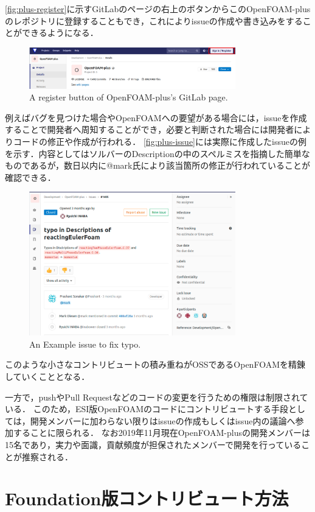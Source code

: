 \documentclass{ltjoc}
\begin{document}
\autoref{fig:plus-register}に示すGitLabのページの右上のボタンからこのOpenFOAM-plusのレポジトリに登録することもでき，これによりissueの作成や書き込みをすることができるようになる．
\begin{figure}[htbp]
\centering
\includegraphics[width=0.8\textwidth]{fig/plus_register.png}
\caption{A register button of OpenFOAM-plus's GitLab page.}
\label{fig:plus-register}
\end{figure}
例えばバグを見つけた場合やOpenFOAMへの要望がある場合には，issueを作成することで開発者へ周知することができ，必要と判断された場合には開発者によりコードの修正や作成が行われる．
\autoref{fig:plus-issue}には実際に作成したissueの例を示す．内容としてはソルバーのDescriptionの中のスペルミスを指摘した簡単なものであるが，数日以内に@mark氏により該当箇所の修正が行われていることが確認できる．
\begin{figure}[htbp]
\centering
\includegraphics[width=0.8\textwidth]{fig/plus_issue.png}
\caption{An Example issue to fix typo.}
\label{fig:plus-issue}
\end{figure}
このような小さなコントリビュートの積み重ねがOSSであるOpenFOAMを精錬していくこととなる．

一方で，pushやPull Requestなどのコードの変更を行うための権限は制限されている．
このため，ESI版OpenFOAMのコードにコントリビュートする手段としては，開発メンバーに加わらない限りはissueの作成もしくはissue内の議論へ参加することに限られる．
なお2019年11月現在OpenFOAM-plusの開発メンバーは15名であり，実力や面識，貢献頻度が担保されたメンバーで開発を行っていることが推察される．\cite{URL:GitLab-plus}
%
\section{Foundation版コントリビュート方法}
\end{document}
